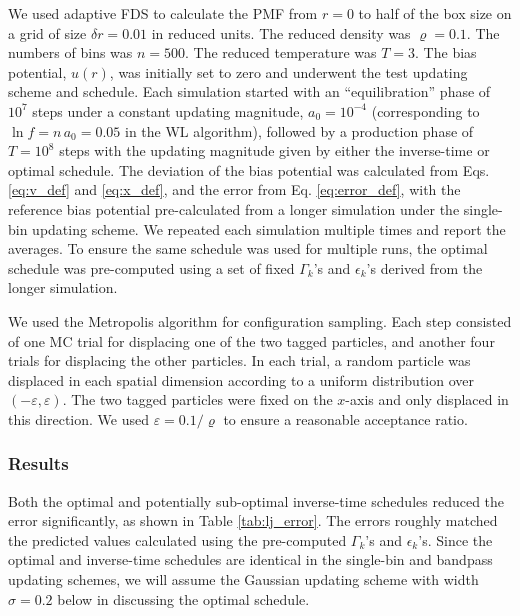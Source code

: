 \documentclass[reprint, superscriptaddress, floatfix]{revtex4-1}
\begin{document}
We used adaptive FDS to calculate
the PMF from $r = 0$ to half of the box size
on a grid of size $\delta r = 0.01$ in reduced units.
%
The reduced density was $\varrho = 0.1$.
The numbers of bins was $n = 500$.
The reduced temperature was $T = 3$.
%
The bias potential, $u(r)$,
was initially set to zero and
underwent the test updating scheme and schedule.
%
Each simulation started with an ``equilibration'' phase
of $10^7$ steps under a constant updating magnitude,
$a_0 = 10^{-4}$
(corresponding to $\ln f = n \, a_0 = 0.05$ in the WL algorithm),
followed by a production phase of
$T = 10^8$ steps
with the updating magnitude given by
either the inverse-time or optimal schedule.
%
The deviation of the bias potential was calculated from
Eqs. \eqref{eq:v_def} and \eqref{eq:x_def},
and the error from Eq. \eqref{eq:error_def},
with the reference bias potential
pre-calculated from a longer simulation
under the single-bin updating scheme.
%
We repeated each simulation multiple times
and report the averages.
%
To ensure the same schedule was used for multiple runs,
the optimal schedule was pre-computed using a set of fixed
$\Gamma_k$'s and $\epsilon_k$'s derived from the longer simulation.

We used the Metropolis algorithm\cite{frenkel, metropolis1953}
for configuration sampling.
%
Each step consisted of
one MC trial for displacing one of the two tagged particles,
and another four trials for displacing the other particles.
%
In each trial,
a random particle was displaced in each spatial dimension
according to a uniform distribution over $(-\varepsilon, \varepsilon)$.
%
The two tagged particles were fixed on the $x$-axis
and only displaced in this direction.
%
We used $\varepsilon = 0.1/\varrho$
to ensure a reasonable acceptance ratio.



\subsubsection{Results}




Both the optimal and potentially sub-optimal inverse-time schedules
reduced the error significantly,
as shown in Table \ref{tab:lj_error}.
%
The errors roughly matched the predicted values
calculated using the pre-computed
$\Gamma_k$'s and $\epsilon_k$'s.
%
Since the optimal and inverse-time schedules are identical
in the single-bin and bandpass updating schemes,
we will assume the Gaussian updating scheme with width $\sigma = 0.2$ below
in discussing the optimal schedule.
\end{document}
